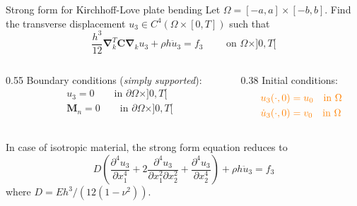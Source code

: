 \documentclass[aspectratio=169]{beamer}
\begin{document}
{
\color{white}
\begin{frame}{Strong form for Kirchhoff-Love plate bending}
  Let $\Omega=[-a,a]\times[-b,b]$. Find the transverse displacement $u_{3}\in C^4(\Omega\times[0,T])$ such that
  \begin{equation*}
    \frac{h^3}{12}\boldsymbol{\nabla}_k^T \boldsymbol{C}\boldsymbol{\nabla}_ku_3+\rho h \ddot{u}_3=f_3 \qquad \text{  on  }\Omega\times]0,T[
  \end{equation*}
  \begin{columns}
    \begin{column}{0.55\textwidth}
      Boundary conditions (\emph{simply supported}):
      \[
        \begin{aligned}
           & u_3 = 0\qquad \text{in }\partial\Omega\times]0,T[         \\
           & \mathbf M_n = 0\qquad \text{in }\partial\Omega\times]0,T[ \\
        \end{aligned}
      \]
    \end{column}

    \begin{column}{0.38\textwidth}
      Initial conditions:
      \[
        \begin{aligned}
           & \color{orange}{u_3(\cdot, 0) =  u_0 \quad \text{in }\Omega}      \\
           & \color{orange}{\dot{u}_3(\cdot, 0) = v_0 \quad \text{in }\Omega} \\
        \end{aligned}
      \]
    \end{column}
  \end{columns}
  \begin{tcolorbox}[colback=darkred!10,colframe=darkred!40!black]
    In case of isotropic material, the strong form equation reduces to
    $$  D\left(
      \frac{\partial^4 u_3}{\partial x_1^4}
      + 2\frac{\partial^4 u_3}{\partial x_1^2 \partial x_2^2}
      + \frac{\partial^4 u_3}{\partial x_2^4}
      \right)   + \rho h \ddot{u}_3
      = f_3$$
    where $D=Eh^3/(12(1-\nu^2))$.
  \end{tcolorbox}
\end{frame}
}
\end{document}
